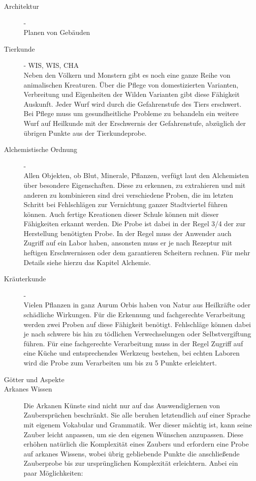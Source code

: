 \documentclass[a4paper,12pt,oneside]{book}
\begin{document}
\begin{description}
\item[Architektur]-
\\Planen von Gebäuden
\item[Tierkunde]- WIS, WIS, CHA
\\Neben den Völkern und Monstern gibt es noch eine ganze Reihe von animalischen Kreaturen. Über die Pflege von domestizierten Varianten, Verbreitung und Eigenheiten der Wilden Varianten gibt diese Fähigkeit Auskunft. Jeder Wurf wird durch die Gefahrenstufe des Tiers erschwert. Bei Pflege muss um gesundheitliche Probleme zu behandeln ein weitere Wurf auf Heilkunde mit der Erschwernis der Gefahrenstufe, abzüglich der übrigen Punkte aus der Tierkundeprobe.
\item[Alchemistische Ordnung]-
\\Allen Objekten, ob Blut, Minerale, Pflanzen, verfügt laut den Alchemisten über besondere Eigenschaften. Diese zu erkennen, zu extrahieren und mit anderen zu kombinieren sind drei verschiedene Proben, die im letzten Schritt bei Fehlschlägen zur Vernichtung ganzer Stadtviertel führen können. Auch fertige Kreationen dieser Schule können mit dieser Fähigkeiten erkannt werden. Die Probe ist dabei in der Regel 3/4 der zur Herstellung benötigten Probe. In der Regel muss der Anwender auch Zugriff auf ein Labor haben, ansonsten muss er je nach Rezeptur mit heftigen Erschwernissen oder dem garantieren Scheitern rechnen. Für mehr Details siehe hierzu das Kapitel Alchemie.
\item[Kräuterkunde]-
\\Vielen Pflanzen in ganz Aurum Orbis haben von Natur aus Heilkräfte oder schädliche Wirkungen. Für die Erkennung und fachgerechte Verarbeitung werden zwei Proben auf diese Fähigkeit benötigt. Fehlschläge können dabei je nach schwere bis hin zu tödlichen Verwechselungen oder Selbstvergiftung führen. Für eine fachgerechte Verarbeitung muss in der Regel Zugriff auf eine Küche und entsprechendes Werkzeug bestehen, bei echten Laboren wird die Probe zum Verarbeiten um bis zu 5 Punkte erleichtert. 
\item[Götter und Aspekte]
\item[Arkanes Wissen]Die Arkanen Künste sind nicht nur auf das Auswendiglernen von Zaubersprüchen beschränkt. Sie alle beruhen letztendlich auf einer Sprache mit eigenem Vokabular und Grammatik. Wer dieser mächtig ist, kann seine Zauber leicht anpassen, um sie den eigenen Wünschen anzupassen. Diese erhöhen natürlich die Komplexität eines Zaubers und erfordern eine Probe auf arkanes Wissens, wobei übrig gebliebende Punkte die anschließende Zauberprobe bis zur ursprünglichen Komplexität erleichtern. Anbei ein paar Möglichkeiten:

\end{description}
\end{document}
